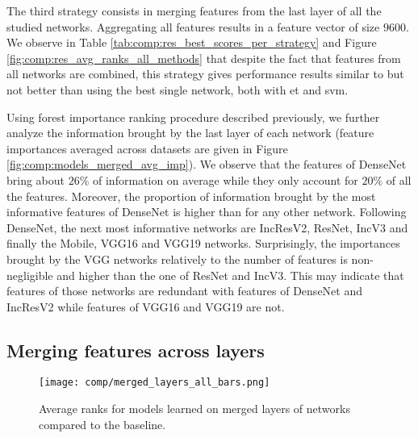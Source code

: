 The third strategy consists in merging features from the last layer of all the studied networks. Aggregating all features results in a feature vector of size $9600$. We observe in Table \ref{tab:comp:res_best_scores_per_strategy} and Figure \ref{fig:comp:res_avg_ranks_all_methods} that despite the fact that features from all networks are combined, this strategy gives performance results similar to but not better than using the best single network, both with \acrshort{et} and \acrshort{svm}.

Using forest importance ranking procedure described previously, we further analyze the information brought by the last layer of each network (feature importances averaged across datasets are given in Figure \ref{fig:comp:models_merged_avg_imp}). We observe that the features of DenseNet bring about $26\%$ of information on average while they only account for $20\%$ of all the features. Moreover, the proportion of information brought by the most informative features of DenseNet is higher than for any other network. Following DenseNet, the next most informative networks are IncResV2, ResNet, IncV3 and finally the Mobile, VGG16 and VGG19 networks. 
Surprisingly, the importances brought by the VGG networks relatively to the number of features is non-negligible and higher than the one of ResNet and IncV3. This may indicate that features of those networks are redundant with features of DenseNet and IncResV2 while features of VGG16 and VGG19 are not.


\subsection{Merging features across layers}
\label{ssec:comp:exp_merged_layers}

\begin{figure}
    \centering
    \texttt{[image: comp/merged\_layers\_all\_bars.png]}
    \caption{Average ranks for models learned on merged layers of networks compared to the baseline.}
    \label{fig:comp:res_avg_ranks_merged_layers}
\end{figure}

